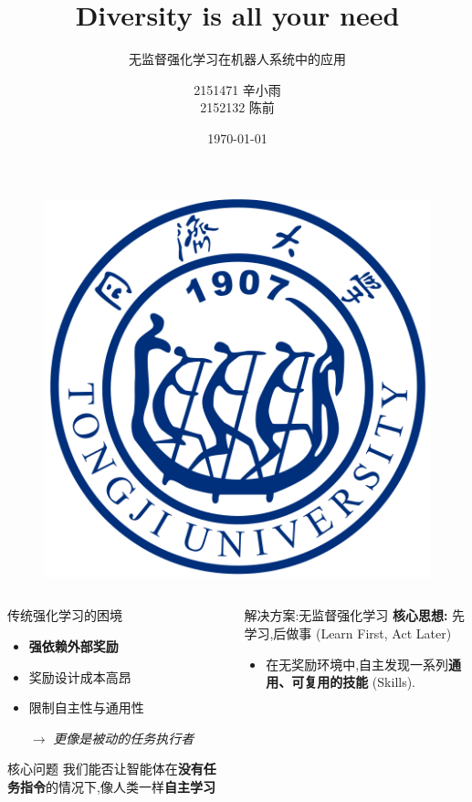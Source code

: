 \documentclass{beamer}
\author[同济大学国豪书院]
{
2151471 \quad 辛小雨
\\
2152132 \quad 陈前
}
\title{\textrm{Diversity is all your need}}
\subtitle{无监督强化学习在机器人系统中的应用}
\institute
{
同济大学国豪书院
}
\date{\today}
\begin{document}
\begin{frame}
    \titlepage
    \begin{figure}[htpb]
       \begin{center}
            \includegraphics[width=0.2\linewidth]{pic/tongji_logo.png}
        \end{center}
    \end{figure}
\end{frame}

\begin{frame}
\tiny
     \begin{columns}[T] %

         \begin{column}{0.5\textwidth}
            \begin{block}{传统强化学习的困境}
                \begin{itemize}
                    \item \textbf{强依赖外部奖励}
                    \item 奖励设计成本高昂
                    \item 限制自主性与通用性
                    \item[$\rightarrow$] \textit{更像是被动的任务执行者}
                \end{itemize}
            \end{block}

            \begin{alertblock}{核心问题}
                 我们能否让智能体在\textbf{没有任务指令}的情况下,像人类一样\textbf{自主学习}
            \end{alertblock}
        \end{column}
        \begin{column}{0.5\textwidth}
            \begin{block}{解决方案:无监督强化学习}
                \textbf{核心思想:} 先学习,后做事 (Learn First, Act Later)
                \begin{itemize}
                    \item 在无奖励环境中,自主发现一系列\textbf{通用、可复用的技能} (Skills).
                \end{itemize}
            \end{block}


\end{column}
\end{columns}
\end{frame}
\end{document}

